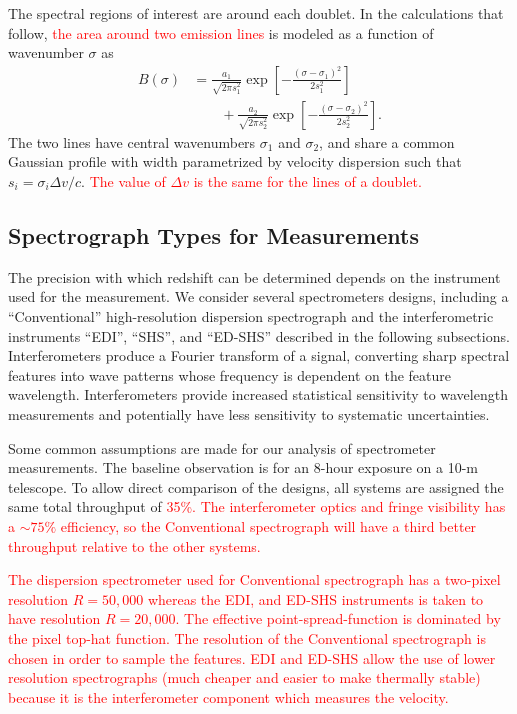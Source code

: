 \documentclass[preprint2, 10pt]{aastex}
\begin{document}
The spectral regions of interest
are around each doublet.  In the calculations that follow,
\textcolor{red}{
the area around two emission lines
}
is modeled as a function of wavenumber $\sigma$ as
\begin{align}
B(\sigma)& =\frac{a_1}{\sqrt{2\pi s_1^2}}\exp{\left[-\frac{\left(\sigma-\sigma_1\right)^2}{2s_1^2}\right]} \nonumber\\
 &\qquad +\frac{a_2}{\sqrt{2\pi s_2^2}}\exp{\left[-\frac{\left(\sigma-\sigma_2\right)^2}{2s_2^2}\right]}.
\label{input:eqn}
\end{align}
The two lines have central wavenumbers $\sigma_1$ and $\sigma_2$, and share a common Gaussian profile with width parametrized by velocity dispersion
such that $s_i=\sigma_i\Delta v/c$.
\textcolor{red}{The value of 
$\Delta v$ is the same for the lines of a doublet.} 



\subsection{Spectrograph Types for Measurements} 

The precision with which redshift can be determined depends on the instrument used for the measurement.
We consider several spectrometers designs, including a ``Conventional'' high-resolution dispersion spectrograph and the
interferometric instruments ``EDI'',
``SHS'', and ``ED-SHS'' described in the following subsections.  Interferometers produce a Fourier transform of a signal, converting sharp
spectral features into wave patterns whose frequency is dependent on the feature wavelength.  Interferometers provide
increased statistical sensitivity to wavelength measurements and potentially have less sensitivity to systematic
uncertainties.

Some common assumptions are made for our analysis of spectrometer 
measurements. 
The baseline observation is for an 8-hour exposure on a 10-m telescope.
To allow direct comparison of the 
designs, all systems are assigned the same total throughput of
\textcolor{red}{ 35\%.
The interferometer optics and fringe visibility has a $\sim 75\%$ efficiency, so the Conventional spectrograph
will have a third better throughput relative to the other systems.}

\textcolor{red}{
The dispersion spectrometer used for Conventional spectrograph has a two-pixel resolution $R=50{,}000$
whereas the EDI, and ED-SHS instruments is taken to have resolution $R=20{,}000$.  The
effective point-spread-function is dominated by the pixel top-hat function.
The resolution of the Conventional spectrograph is chosen in order to sample the features.
EDI and ED-SHS allow the use of lower resolution spectrographs (much cheaper and easier to make thermally stable)
because it is the interferometer component which measures the velocity.}
\end{document}
